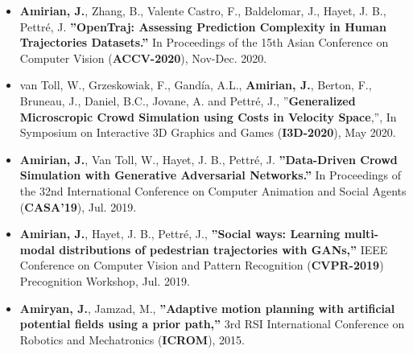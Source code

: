 \documentclass[10pt]{res}
\begin{document}
\begin{resume}
\begin{itemize}
\item {\bf Amirian, J.}, Zhang, B., Valente Castro, F., Baldelomar, J., Hayet, J. B., Pettré, J. {\bf ''OpenTraj: Assessing Prediction Complexity in Human Trajectories Datasets.''} In Proceedings of the 15th Asian Conference on Computer Vision (\textbf{ACCV-2020}), Nov-Dec. 2020.

\item van Toll, W., Grzeskowiak, F., Gandía, A.L., \textbf{Amirian, J.}, Berton, F., Bruneau, J., Daniel, B.C., Jovane, A. and Pettré, J., ''\textbf{Generalized Microscropic Crowd Simulation using Costs in Velocity Space},'', In Symposium on Interactive 3D Graphics and Games (\textbf{I3D-2020}), May 2020.

\item {\bf Amirian, J.}, Van Toll, W., Hayet, J. B., Pettré, J. {\bf ''Data-Driven Crowd Simulation with Generative Adversarial Networks.''} In Proceedings of the 32nd International Conference on Computer Animation and Social Agents (\textbf{CASA'19}), Jul. 2019.

\item {\bf Amirian, J.}, Hayet, J. B., Pettré, J., {\bf ''Social ways: Learning multi-modal distributions of pedestrian trajectories with GANs,''} IEEE Conference on Computer Vision and Pattern Recognition (\textbf{CVPR-2019}) Precognition Workshop, Jul. 2019.


\item {\bf Amiryan, J.}, Jamzad, M., {\bf ''Adaptive motion planning with artificial potential fields using a prior path,''} 3rd RSI International Conference on Robotics and Mechatronics (\textbf{ICROM}), 2015.



\end{itemize}



\end{resume}
\end{document}
